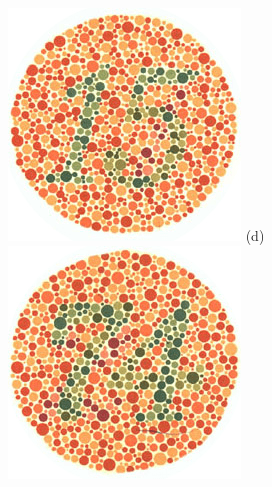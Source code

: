 \documentclass[	12pt, Times, openright, twoside, a4paper, english, brazil]{abntex2}
\begin{document}
\begin{apendicesenv}
\begin{figure}[!htb]
\centering
{\includegraphics[width=\linewidth]{ishihara-transformacao/plate8.jpg}}
(d)
\endminipage\hfill
{}
\centering
{\includegraphics[width=\linewidth]{ishihara-transformacao/plate9.jpg}}

\end{figure}
\end{apendicesenv}
\end{document}
